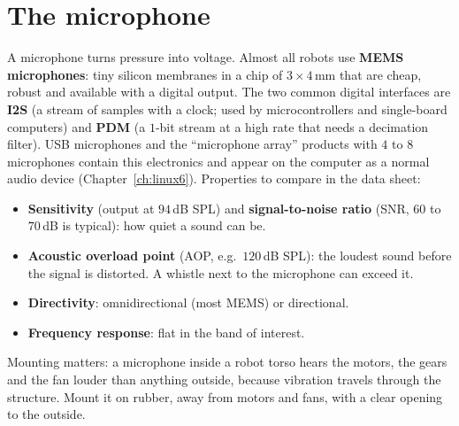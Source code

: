 \section*{The microphone}
A microphone turns pressure into voltage. Almost all robots use \textbf{MEMS microphones}: tiny silicon membranes in a chip of $3\times4$\,mm that are cheap, robust and available with a digital output. The two common digital interfaces are \textbf{I2S} (a stream of samples with a clock; used by microcontrollers and single-board computers) and \textbf{PDM} (a $1$-bit stream at a high rate that needs a decimation filter). USB microphones and the ``microphone array'' products with $4$ to $8$ microphones contain this electronics and appear on the computer as a normal audio device (Chapter~\ref{ch:linux6}). Properties to compare in the data sheet:
\begin{itemize}[nosep]
  \item \textbf{Sensitivity} (output at $94$\,dB SPL) and \textbf{signal-to-noise ratio} (SNR, $60$ to $70$\,dB is typical): how quiet a sound can be.
  \item \textbf{Acoustic overload point} (AOP, e.g.\ $120$\,dB SPL): the loudest sound before the signal is distorted. A whistle next to the microphone can exceed it.
  \item \textbf{Directivity}: omnidirectional (most MEMS) or directional.
  \item \textbf{Frequency response}: flat in the band of interest.
\end{itemize}
Mounting matters: a microphone inside a robot torso hears the motors, the gears and the fan louder than anything outside, because vibration travels through the structure. Mount it on rubber, away from motors and fans, with a clear opening to the outside.

